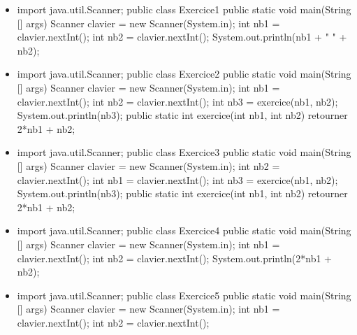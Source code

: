 \documentclass[11pt,a4paper]{article}
\begin{document}
\begin{itemize}
			\item \begin{Java}
import java.util.Scanner;
public class Exercice1 {
    public static void main(String [] args) {
        Scanner clavier = new Scanner(System.in);
        int nb1 = clavier.nextInt();
        int nb2 = clavier.nextInt();
        System.out.println(nb1 + " " + nb2);
    }
}
        \end{Java} \textcolor{gray}{\underline{\hspace*{2em}}} 
			\item \begin{Java}
import java.util.Scanner;
public class Exercice2 {
    public static void main(String [] args) {
        Scanner clavier = new Scanner(System.in);
        int nb1 = clavier.nextInt();
        int nb2 = clavier.nextInt();
        int nb3 = exercice(nb1, nb2);
        System.out.println(nb3);
    }
    public static int exercice(int nb1, int nb2) {
        retourner 2*nb1 + nb2;
    }
}
        \end{Java} \textcolor{gray}{\underline{\hspace*{1em}}} 
			\item \begin{Java}
import java.util.Scanner;
public class Exercice3 {
    public static void main(String [] args) {
        Scanner clavier = new Scanner(System.in);
        int nb2 = clavier.nextInt();
        int nb1 = clavier.nextInt();
        int nb3 = exercice(nb1, nb2);
        System.out.println(nb3);
    }
    public static int exercice(int nb1, int nb2) {
        retourner 2*nb1 + nb2;
    }
}
        \end{Java} \textcolor{gray}{\underline{\hspace*{1em}}} 
			\item \begin{Java}
import java.util.Scanner;
public class Exercice4 {
    public static void main(String [] args) {
        Scanner clavier = new Scanner(System.in);
        int nb1 = clavier.nextInt();
        int nb2 = clavier.nextInt();
        System.out.println(2*nb1 + nb2);
    }
}
        \end{Java} \textcolor{gray}{\underline{\hspace*{1em}}} 
			\item \begin{Java}
import java.util.Scanner;
public class Exercice5 {
    public static void main(String [] args) {
        Scanner clavier = new Scanner(System.in);
        int nb1 = clavier.nextInt();
        int nb2 = clavier.nextInt();
}}
\end{Java}
\end{itemize}
\end{document}
